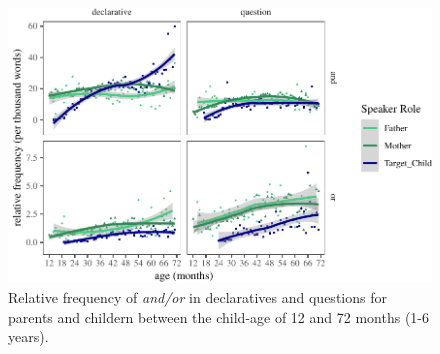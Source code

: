 \documentclass[,man,floatsintext]{apa6}
\begin{document}
\begin{figure}[tb]

{\centering \includegraphics{figs/ageSpeechActPlot-1} 

}

\caption{Relative frequency of \textit{and/or} in declaratives and questions for parents and childern between the child-age of 12 and 72 months (1-6 years).}\label{fig:ageSpeechActPlot}
\end{figure}
\end{document}
